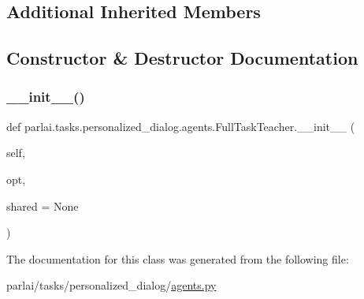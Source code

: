 \subsection*{Additional Inherited Members}


\subsection{Constructor \& Destructor Documentation}
\mbox{\label{classparlai_1_1tasks_1_1personalized__dialog_1_1agents_1_1FullTaskTeacher_a2f07307405aafc3bc903ce7f172f45c0}} 
\subsubsection{\texorpdfstring{\+\_\+\+\_\+init\+\_\+\+\_\+()}{\_\_init\_\_()}}
{\footnotesize\ttfamily def parlai.\+tasks.\+personalized\+\_\+dialog.\+agents.\+Full\+Task\+Teacher.\+\_\+\+\_\+init\+\_\+\+\_\+ (\begin{DoxyParamCaption}\item[{}]{self,  }\item[{}]{opt,  }\item[{}]{shared = {\ttfamily None} }\end{DoxyParamCaption})}



The documentation for this class was generated from the following file\+:\begin{DoxyCompactItemize}
\item 
parlai/tasks/personalized\+\_\+dialog/\hyperlink{parlai_2tasks_2personalized__dialog_2agents_8py}{agents.\+py}\end{DoxyCompactItemize}
